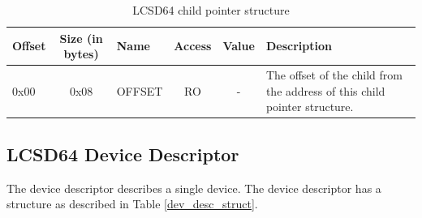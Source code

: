 \documentclass[a4paper, 12pt]{article}
\begin{document}
\begin{center}
\begin{savenotes}
\begin{table}[!ht]\footnotesize
\caption{LCSD64 child pointer structure}\label{cp_block_struct}\centering
\begin{adjustwidth}{-0.4in}{-1in}%
\begin{tabular}{| l | c | l | c | c | p{5cm} |} \hline
Offset & Size (in bytes) & Name & Access & Value & Description \\ \hline
0x00 & 0x08 & OFFSET & RO & - & The offset of the child from the address of this child pointer structure. \\ \hline
\end{tabular}
\end{adjustwidth}
\end{table}
\end{savenotes}
\end{center}


\subsection{LCSD64 Device Descriptor}\label{device_block}

The device descriptor describes a single device. The device descriptor has a
structure as described in Table \ref{dev_desc_struct}.
\end{document}
